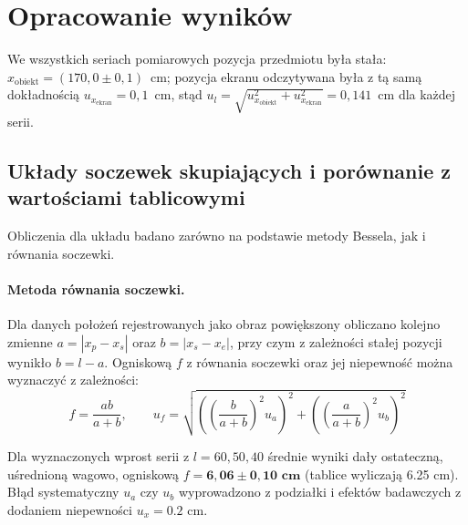 \documentclass[12pt, a4paper]{article}
\begin{document}
\section{Opracowanie wyników}


We wszystkich seriach pomiarowych pozycja przedmiotu była stała:
$x_{\mathrm{obiekt}} = (170{,}0\pm0{,}1)$~cm;
pozycja ekranu odczytywana była z tą samą dokładnością
$u_{x_{\mathrm{ekran}}} = 0{,}1$~cm,
stąd $u_l = \sqrt{u_{x_{\mathrm{obiekt}}}^2 + u_{x_{\mathrm{ekran}}}^2} = 0{,}141$~cm
dla każdej serii.

\subsection{Układy soczewek skupiających i porównanie z wartościami tablicowymi}

Obliczenia dla układu badano zarówno na podstawie metody Bessela, jak i równania soczewki. 
\paragraph{Metoda równania soczewki.} Dla danych położeń rejestrowanych jako obraz powiększony obliczano kolejno zmienne $a = |x_p - x_s|$ oraz $b = |x_s - x_e|$, przy czym z zależności stałej pozycji wynikło $b = l - a$. Ogniskową $f$ z równania soczewki oraz jej niepewność można wyznaczyć z zależności:
\begin{equation}
    f = \frac{a b}{a + b}, \qquad u_f = \sqrt{{\left( {\left(\frac{b}{a+b}\right)}^2 u_a \right)}^2 + {\left( {\left(\frac{a}{a+b}\right)}^2 u_b \right)}^2}
    \label{eq:socz_f}
\end{equation}

Dla wyznaczonych wprost serii z $l=60, 50, 40$ średnie wyniki dały ostateczną, uśrednioną wagowo, ogniskową $f = \mathbf{6{,}06 \pm 0{,}10\text{ cm}}$ (tablice wyliczają 6.25 cm). Błąd systematyczny $u_a$ czy $u_b$ wyprowadzono z podziałki i efektów badawczych z dodaniem niepewności $u_x=0.2\text{ cm}$.
\end{document}
